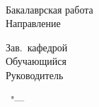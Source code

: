 \thispagestyle{empty}
\begin{center}
\thesisOrganization
\end{center}

%
\vspace{0pt plus1fill} %
\begin{center}
{\thesisFacultyTitle} \\
{\thesisCafedrTitle}
\end{center}
%
\vspace{0pt plus2fill} %
\begin{center}
\textbf { %
\thesisTitle}

\vspace{0pt plus2fill} %
{%
Бакалаврская работа \\
Направление \thesisSpecialtyNumber \space
\thesisSpecialtyTitle
}

\vspace{0pt plus2fill} %
\end{center}
%
\vspace{0pt plus6fill} %
\begin{flushright}
		Зав.~кафедрой\space\underline{\hspace{3cm}}\space\supervisorRegaliaShort\space\supervisorFioShort \\
		Обучающийся\space\underline{\hspace{3cm}}\hspace{3.2cm}\thesisAuthorShort \\
		Руководитель\space\underline{\hspace{3cm}}\space\supervisorRegaliaShort\space\supervisorFioShort 		
\end{flushright}
%
\vspace{0pt plus2fill} %
{\centering\thesisCity\ "--- \thesisYear\par}
